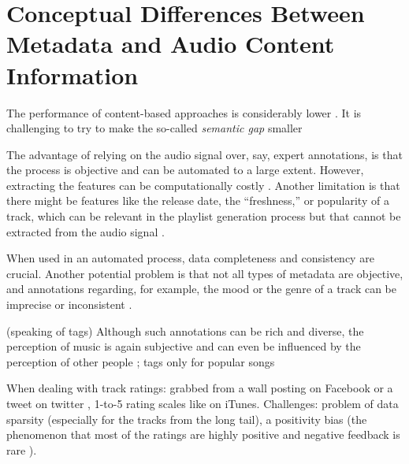\section{Conceptual Differences Between Metadata and Audio Content Information}
The performance of content-based approaches is considerably lower \cite{slaney2011}.
It is challenging to try to make the so-called \textit{semantic gap} smaller \cite{aucou2009}

The advantage of relying on the audio signal over, say, expert annotations, is that
the process is objective and can be automated to a large extent. However, extracting
the features can be computationally costly \cite{schma13}. Another
limitation is that there might be features like the release date, the “freshness,” or
popularity of a track, which can be relevant in the playlist generation process but that
cannot be extracted from the audio signal \cite{celma08}.

When used in an automated process, data completeness and consistency are crucial.
Another potential problem is that not all types of metadata are objective, and annotations regarding, for example, the mood or the genre of a track can be imprecise or inconsistent \cite{celma2010}.

(speaking of tags) Although such annotations can be rich and diverse, the perception of music is again subjective and can even be influenced by the perception of other people \cite{mcdermott12}; tags only for popular songs \cite{celma2010}

When dealing with track ratings: grabbed from a wall posting on Facebook \cite{germain13} or a tweet on twitter \cite{hauger13}, 1-to-5 rating scales like on iTunes. Challenges: problem of data sparsity (especially for the tracks from the long tail), a positivity bias (the phenomenon that most of the ratings are highly positive and negative feedback is rare \cite{celma2010}).